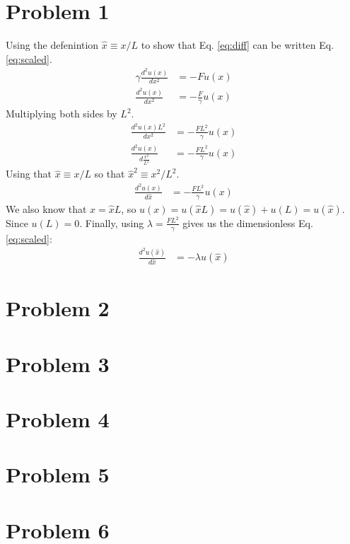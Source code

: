 \documentclass[english,notitlepage]{revtex4-1}  %
\begin{document}
\section*{Problem 1}
Using the defenintion $\hat{x} \equiv x / L$ to show that Eq. \ref*{eq:diff} can be written Eq. \ref*{eq:scaled}.
\begin{align*}
    \gamma \frac{d^2u(x)}{dx^2} &= - F u(x) \\
    \frac{d^2u(x)}{dx^2} &= - \frac{F}{\gamma} u(x)
\end{align*}
Multiplying both sides by $L^2$.
\begin{align*}
    \frac{d^2u(x)L^2}{dx^2} &= - \frac{FL^2}{\gamma} u(x) \\
    \frac{d^2u(x)}{d\frac{x^2}{L^2}} &= - \frac{FL^2}{\gamma} u(x)
\end{align*}
Using that $\hat{x} \equiv x / L$ so that $\hat{x}^2 \equiv x^2 / L^2$.
\begin{align*}
    \frac{d^2u(x)}{d\hat{x}} &= - \frac{FL^2}{\gamma} u(x)
\end{align*}
We also know that $x = \hat{x}L$, so $u(x) = u(\hat{x}L) = u(\hat{x}) + u(L) = u(\hat{x})$. Since $u(L) = 0$. Finally, using $\lambda = \frac{FL^2}{\gamma}$ gives us the dimensionless Eq. \ref*{eq:scaled}:
\begin{align*}
    \frac{d^2u(\hat{x})}{d\hat{x}} &= - \lambda u(\hat{x})
\end{align*}
\section*{Problem 2}

\section*{Problem 3}

\section*{Problem 4}

\section*{Problem 5}

\section*{Problem 6}
\end{document}

